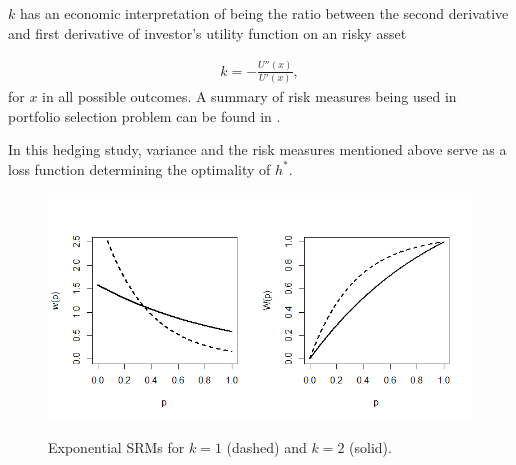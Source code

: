 $k$ has an economic interpretation of being the ratio between the second derivative and first derivative
of investor's utility function on an risky asset

\begin{align}
	k = -\frac{U''(x)}{U'(x)},
	\end{align}
for $x$ in all possible outcomes.
A summary of risk measures being used in portfolio selection problem can be found in \citet{hardle2008applied}.\medskip

In this hedging study, variance and the risk measures mentioned above serve as a loss function determining the optimality
of $h^\ast$.

\begin{figure}[h]
	\begin{center}
		\includegraphics[scale = 0.7]{Figures/Fig1-1.png}\\
	\end{center}
	\caption{Exponential SRMs for $k=1$ (dashed) and $k=2$ (solid).}\label{Fig1:EPSRM}
\end{figure}
